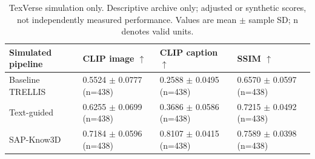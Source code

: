 \begin{table}[t]
\centering
\small
\caption{TexVerse simulation only. Descriptive archive only; adjusted or synthetic scores, not independently measured performance. Values are mean $\pm$ sample SD; n denotes valid units.}
\begin{tabular}{llll}
\toprule
Simulated pipeline & CLIP image $\uparrow$ & CLIP caption $\uparrow$ & SSIM $\uparrow$ \\
\midrule
Baseline TRELLIS & 0.5524 $\pm$ 0.0777 (n=438) & 0.2588 $\pm$ 0.0495 (n=438) & 0.6570 $\pm$ 0.0597 (n=438) \\
Text-guided & 0.6255 $\pm$ 0.0699 (n=438) & 0.3686 $\pm$ 0.0586 (n=438) & 0.7215 $\pm$ 0.0492 (n=438) \\
SAP-Know3D & 0.7184 $\pm$ 0.0596 (n=438) & 0.8107 $\pm$ 0.0415 (n=438) & 0.7589 $\pm$ 0.0398 (n=438) \\
\bottomrule
\end{tabular}
\end{table}

